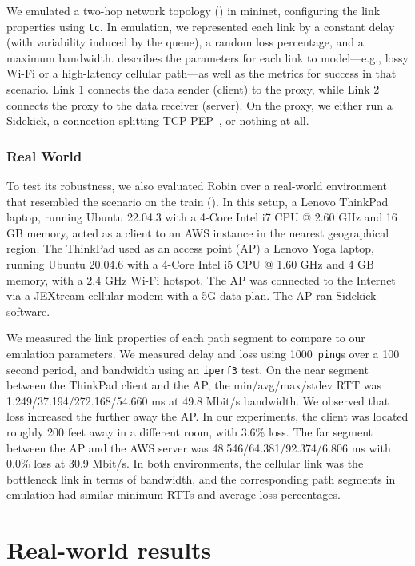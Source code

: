 We emulated a two-hop network topology () in mininet,
configuring the link properties using \texttt{tc}.
In emulation, we represented
each link by a constant delay (with variability induced by the queue), a random
loss percentage, and a maximum bandwidth.
 describes the parameters
for each link to model---e.g., lossy Wi-Fi or a high-latency cellular
path---as well as the metrics for success in that scenario.
Link 1 connects the data sender (client) to the proxy,
while Link 2 connects the proxy to the data receiver (server).
On the proxy, we either run a Sidekick,
a connection-splitting TCP PEP~\cite{caini2006pepsal}, or nothing at all.

\subsubsection{Real World}

To test its robustness, we also evaluated Robin over a real-world
environment that resembled the scenario on the train ().
In this setup, a Lenovo ThinkPad laptop, running Ubuntu 22.04.3 with a 4-Core
Intel i7 CPU @ 2.60 GHz and 16 GB memory, acted as a client to an AWS instance in
the nearest geographical region. The ThinkPad used as an access point (AP)
a Lenovo Yoga laptop, running Ubuntu 20.04.6 with a 4-Core Intel i5 CPU @
1.60 GHz and 4 GB memory, with a 2.4 GHz Wi-Fi hotspot.
The AP was connected to the Internet via a JEXtream cellular modem
with a 5G data plan. The AP ran Sidekick software.

We measured the link properties of each path segment to compare to
our emulation parameters. We measured delay and loss using 1000~\texttt{ping}s
over a 100 second period, and bandwidth using an \texttt{iperf3} test.
On the near segment between the ThinkPad client and the AP,
the min/avg/max/stdev RTT was 1.249/37.194/272.168/54.660 ms
at 49.8 Mbit/s bandwidth. We observed that loss increased
the further away the AP. In our experiments, the client was located roughly
200 feet away in a different room, with 3.6\% loss.
The far segment between the AP and the AWS server was
48.546/64.381/92.374/6.806 ms with 0.0\% loss at 30.9 Mbit/s.
In both environments, the cellular link was the bottleneck link in terms of
bandwidth, and the corresponding path segments in emulation had similar
minimum RTTs and average loss percentages.

\section{Real-world results}
\label{sec:sidekick:real-world}

